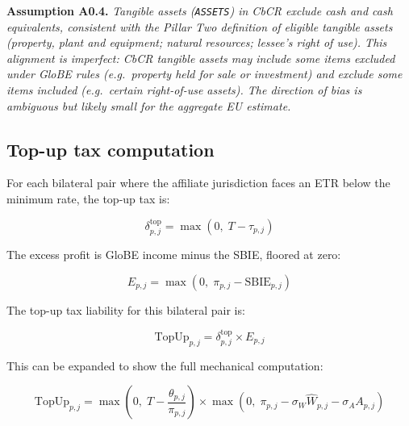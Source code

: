 \documentclass[11pt,a4paper]{article}
\newcommand{\code}[1]{\texttt{#1}}
\newcommand{\assumption}[2]{\noindent\textbf{Assumption #1.} \textit{#2}\medskip}
\begin{document}
\assumption{A0.4}{Tangible assets (\code{ASSETS}) in CbCR exclude cash and cash equivalents, consistent with the Pillar Two definition of eligible tangible assets (property, plant and equipment; natural resources; lessee's right of use). This alignment is imperfect: CbCR tangible assets may include some items excluded under GloBE rules (e.g.\ property held for sale or investment) and exclude some items included (e.g.\ certain right-of-use assets). The direction of bias is ambiguous but likely small for the aggregate EU estimate.}

\subsection{Top-up tax computation}\label{sec:topup}

For each bilateral pair where the affiliate jurisdiction faces an ETR below the minimum rate, the top-up tax is:

\begin{equation}\label{eq:topup_rate}
\delta_{p,j}^{\text{top}} = \max\!\left(0,\; T - \tau_{p,j}\right)
\end{equation}

The excess profit is GloBE income minus the SBIE, floored at zero:

\begin{equation}\label{eq:excess}
E_{p,j} = \max\!\left(0,\; \pi_{p,j} - \text{SBIE}_{p,j}\right)
\end{equation}

The top-up tax liability for this bilateral pair is:

\begin{equation}\label{eq:topup_tax}
\text{TopUp}_{p,j} = \delta_{p,j}^{\text{top}} \times E_{p,j}
\end{equation}

This can be expanded to show the full mechanical computation:

\begin{equation}\label{eq:topup_expanded}
\text{TopUp}_{p,j} = \max\!\left(0,\; T - \frac{\theta_{p,j}}{\pi_{p,j}}\right) \times \max\!\left(0,\; \pi_{p,j} - \sigma_W \hat{W}_{p,j} - \sigma_A A_{p,j}\right)
\end{equation}
\end{document}
